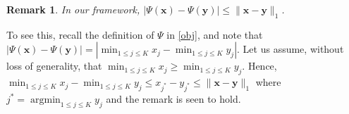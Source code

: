 \documentclass[11pt]{article}
\newcommand{\balpha}{\boldsymbol{\alpha}}
\newcommand{\bTheta}{\boldsymbol{\Theta}}
\newtheorem{lemma}{Lemma}[section]
\newtheorem{remark}{\textbf{Remark}}
\begin{document}
\begin{remark}
    In our framework, $\displaystyle |\Psi(\bm{x})-\Psi(\bm{y})|\le \|\bm{x}-\bm{y}\|_1$.
\end{remark}

To see this, recall the definition of $\Psi$ in \eqref{obj}, and note that $|\Psi(\bm{x})-\Psi(\bm{y})|=|\min_{1\le j\le K}x_j-\min_{1\le j\le K}y_j|$. Let us assume, without loss of generality, that $\min_{1\le j\le K}x_j\ge \min_{1\le j\le K}y_j$. Hence, $\min_{1\le j\le K}x_j-\min_{1\le j\le K}y_j\le x_{j^*}-y_{j^*}\le \|\bm{x}-\bm{y}\|_1$ where $j^* = \operatorname{argmin}_{1\le j\le K}y_j$ and the remark is seen to hold.





\end{document}
